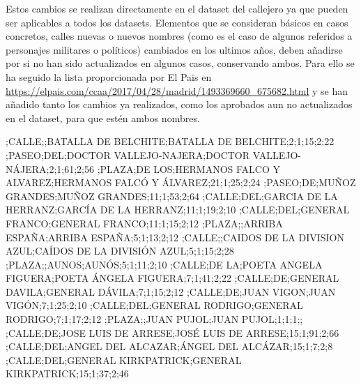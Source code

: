 Estos cambios se realizan directamente en el dataset del callejero ya que pueden ser aplicables a todos los datasets. Elementos que se consideran básicos en casos concretos, calles nuevas o nuevos nombres (como es el caso de algunos referidos a personajes militares o políticos) cambiados en los ultimos años, deben añadirse por si no han sido actualizados en algunos casos, conservando ambos.\newline
Para ello se ha seguido la lista proporcionada por El Pais en \url{https://elpais.com/ccaa/2017/04/28/madrid/1493369660_675682.html}
y se han añadido tanto los cambios ya realizados, como los aprobados aun no actualizados en el dataset, para que estén ambos nombres.
\begin{tiny}
;CALLE;;BATALLA DE BELCHITE;BATALLA DE BELCHITE;2;1;15;2;22
;PASEO;DEL;DOCTOR VALLEJO-NAJERA;DOCTOR VALLEJO-NÁJERA;2;1;61;2;56
;PLAZA;DE LOS;HERMANOS FALCO Y ALVAREZ;HERMANOS FALCÓ Y ÁLVAREZ;21;1;25;2;24
;PASEO;DE;MUÑOZ GRANDES;MUÑOZ GRANDES;11;1;53;2;64
;CALLE;DEL;GARCIA DE LA HERRANZ;GARCÍA DE LA HERRANZ;11;1;19;2;10
;CALLE;DEL;GENERAL FRANCO;GENERAL FRANCO;11;1;15;2;12
;PLAZA;;ARRIBA ESPAÑA;ARRIBA ESPAÑA;5;1;13;2;12
;CALLE;;CAIDOS DE LA DIVISION AZUL;CAÍDOS DE LA DIVISIÓN AZUL;5;1;15;2;28
;PLAZA;;AUNOS;AUNÓS;5;1;11;2;10
;CALLE;DE LA;POETA ANGELA FIGUERA;POETA ÁNGELA FIGUERA;7;1;41;2;22
;CALLE;DE;GENERAL DAVILA;GENERAL DÁVILA;7;1;15;2;12
;CALLE;DE;JUAN VIGON;JUAN VIGÓN;7;1;25;2;10
;CALLE;DEL;GENERAL RODRIGO;GENERAL RODRIGO;7;1;17;2;12
;PLAZA;;JUAN PUJOL;JUAN PUJOL;1;1;1;;
;CALLE;DE;JOSE LUIS DE ARRESE;JOSÉ LUIS DE ARRESE;15;1;91;2;66
;CALLE;DEL;ANGEL DEL ALCAZAR;ÁNGEL DEL ALCÁZAR;15;1;7;2;8
;CALLE;DEL;GENERAL KIRKPATRICK;GENERAL KIRKPATRICK;15;1;37;2;46

\end{tiny}
